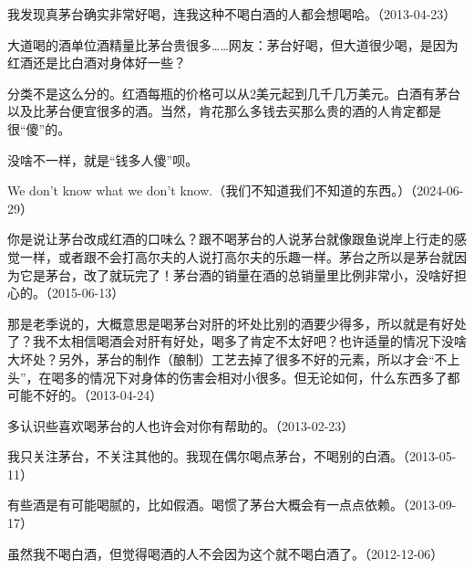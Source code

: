 我发现真茅台确实非常好喝，连我这种不喝白酒的人都会想喝哈。（2013-04-23）


大道喝的酒单位酒精量比茅台贵很多……网友：茅台好喝，但大道很少喝，是因为红酒还是比白酒对身体好一些？

分类不是这么分的。红酒每瓶的价格可以从2美元起到几千几万美元。白酒有茅台以及比茅台便宜很多的酒。当然，肯花那么多钱去买那么贵的酒的人肯定都是很“傻”的。


没啥不一样，就是“钱多人傻”呗。


We don't know what we don't know.（我们不知道我们不知道的东西。）（2024-06-29）


你是说让茅台改成红酒的口味么？跟不喝茅台的人说茅台就像跟鱼说岸上行走的感觉一样，或者跟不会打高尔夫的人说打高尔夫的乐趣一样。茅台之所以是茅台就因为它是茅台，改了就玩完了！茅台酒的销量在酒的总销量里比例非常小，没啥好担心的。（2015-06-13）


那是老季说的，大概意思是喝茅台对肝的坏处比别的酒要少得多，所以就是有好处了？我不太相信喝酒会对肝有好处，喝多了肯定不太好吧？也许适量的情况下没啥大坏处？另外，茅台的制作（酿制）工艺去掉了很多不好的元素，所以才会“不上头”，在喝多的情况下对身体的伤害会相对小很多。但无论如何，什么东西多了都可能不好的。（2013-04-24）


多认识些喜欢喝茅台的人也许会对你有帮助的。（2013-02-23）

我只关注茅台，不关注其他的。我现在偶尔喝点茅台，不喝别的白酒。（2013-05-11）


有些酒是有可能喝腻的，比如假酒。喝惯了茅台大概会有一点点依赖。（2013-09-17）


虽然我不喝白酒，但觉得喝酒的人不会因为这个就不喝白酒了。（2012-12-06）

